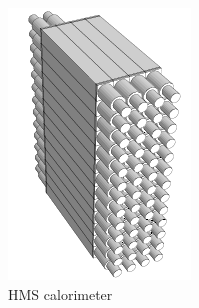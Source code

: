 \begin{figure}[ht]
    \centering
    \begin{subfigure}[b]{0.35\textwidth}
        \centering
        \includegraphics[width=\textwidth]{chap3/hms_calorimeter_drawing_lores.png}
        \caption{HMS calorimeter}
        \label{fig:hms_calorimeter}
    \end{subfigure}
    \hfill
    \begin{subfigure}[b]{0.35\textwidth}
        \centering

\end{subfigure}
\end{figure}
